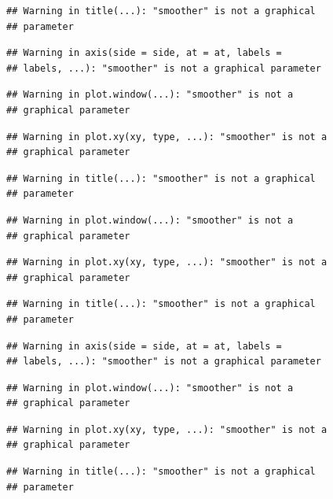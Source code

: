 \documentclass[12pt,]{krantz}
\begin{document}
\begin{verbatim}
## Warning in title(...): "smoother" is not a graphical
## parameter
\end{verbatim}

\begin{verbatim}
## Warning in axis(side = side, at = at, labels =
## labels, ...): "smoother" is not a graphical parameter
\end{verbatim}

\begin{verbatim}
## Warning in plot.window(...): "smoother" is not a
## graphical parameter
\end{verbatim}

\begin{verbatim}
## Warning in plot.xy(xy, type, ...): "smoother" is not a
## graphical parameter
\end{verbatim}

\begin{verbatim}
## Warning in title(...): "smoother" is not a graphical
## parameter
\end{verbatim}

\begin{verbatim}
## Warning in plot.window(...): "smoother" is not a
## graphical parameter
\end{verbatim}

\begin{verbatim}
## Warning in plot.xy(xy, type, ...): "smoother" is not a
## graphical parameter
\end{verbatim}

\begin{verbatim}
## Warning in title(...): "smoother" is not a graphical
## parameter
\end{verbatim}

\begin{verbatim}
## Warning in axis(side = side, at = at, labels =
## labels, ...): "smoother" is not a graphical parameter
\end{verbatim}

\begin{verbatim}
## Warning in plot.window(...): "smoother" is not a
## graphical parameter
\end{verbatim}

\begin{verbatim}
## Warning in plot.xy(xy, type, ...): "smoother" is not a
## graphical parameter
\end{verbatim}

\begin{verbatim}
## Warning in title(...): "smoother" is not a graphical
## parameter
\end{verbatim}
\end{document}
